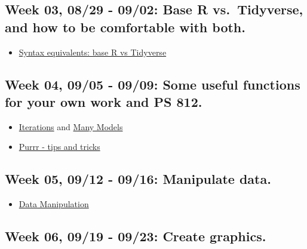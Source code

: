 \documentclass[11pt,]{article}
\providecommand{\tightlist}{%
  \setlength{\itemsep}{0pt}\setlength{\parskip}{0pt}}
\begin{document}
\hypertarget{week-03-0829---0902-base-r-vs.-tidyverse-and-how-to-be-comfortable-with-both.}{%
\subsection{Week 03, 08/29 - 09/02: Base R vs.~Tidyverse, and how to be
comfortable with
both.}\label{week-03-0829---0902-base-r-vs.-tidyverse-and-how-to-be-comfortable-with-both.}}

\begin{itemize}
\tightlist
\item
  \href{https://tavareshugo.github.io/data_carpentry_extras/base-r_tidyverse_equivalents/base-r_tidyverse_equivalents.html}{Syntax
  equivalents: base R vs Tidyverse}
\end{itemize}

\hypertarget{week-04-0905---0909-some-useful-functions-for-your-own-work-and-ps-812.}{%
\subsection{Week 04, 09/05 - 09/09: Some useful functions for your own
work and PS
812.}\label{week-04-0905---0909-some-useful-functions-for-your-own-work-and-ps-812.}}

\begin{itemize}
\tightlist
\item
  \href{https://r4ds.had.co.nz/iteration.html}{Iterations} and
  \href{https://r4ds.had.co.nz/many-models.html}{Many Models}
\item
  \href{https://www.hvitfeldt.me/blog/purrr-tips-and-tricks/}{Purrr -
  tips and tricks}
\end{itemize}

\hypertarget{week-05-0912---0916-manipulate-data.}{%
\subsection{Week 05, 09/12 - 09/16: Manipulate
data.}\label{week-05-0912---0916-manipulate-data.}}

\begin{itemize}
\tightlist
\item
  \href{https://mikedecr.github.io/courses/811/811-03-data/}{Data
  Manipulation}
\end{itemize}

\hypertarget{week-06-0919---0923-create-graphics.}{%
\subsection{Week 06, 09/19 - 09/23: Create
graphics.}\label{week-06-0919---0923-create-graphics.}}
\end{document}
